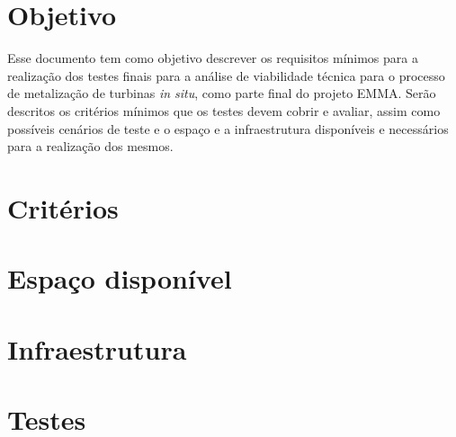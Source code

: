 \documentclass[12pt,a4paper]{article}
\begin{document}



\section{Objetivo}
Esse documento tem como objetivo descrever os requisitos mínimos para a
realização dos testes finais para a análise de viabilidade técnica para o
processo de metalização de turbinas \textit{in situ}, como parte final do
projeto EMMA.
Serão descritos os critérios mínimos que os testes devem cobrir e avaliar, assim
como possíveis cenários de teste e o espaço e a infraestrutura
disponíveis e necessários para a realização dos mesmos.

\section{Critérios}
\label{sec::criterios}


\section{Espaço disponível}


\section{Infraestrutura}


\section{Testes}

\end{document}
